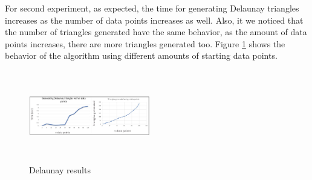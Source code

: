 \documentclass[conference]{IEEEtran}
\begin{document}
For second experiment, as expected, the time for generating Delaunay triangles increases as the number of data points increases as well. Also, it we noticed that the number of triangles generated have the same behavior, as the amount of data points increases, there are more triangles generated too. Figure \ref{fig:Result2} shows the behavior of the algorithm using different amounts of starting data points.

\begin{figure}[H]
    \centering
    \includegraphics[width=200,height=150,keepaspectratio]{graphs.jpg}
    \caption{Delaunay results}
    \label{fig:Result2}
\end{figure}



\end{document}
